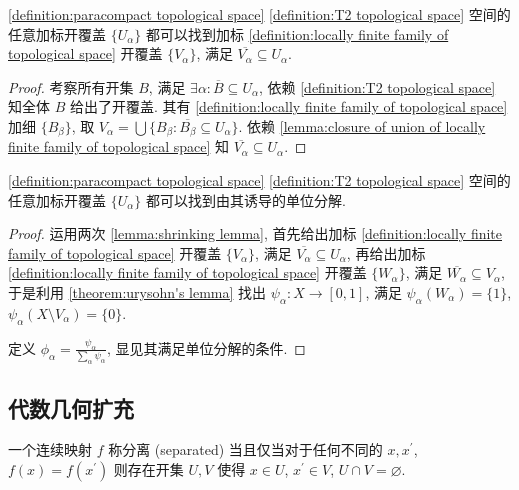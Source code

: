 \begin{lemma}[收缩引理]
    \label {lemma:shrinking lemma}
    \ref{definition:paracompact topological space} \ref{definition:T2 topological space} 空间的任意加标开覆盖 \(\{U_\alpha\}\) 都可以找到加标 \ref{definition:locally finite family of topological space}
    开覆盖 \(\{V_\alpha\}\), 满足 \(\overline{V_\alpha} \subseteq U_\alpha\).

    \begin{proof}
        考察所有开集 \(B\), 满足 \(\exists \alpha : \overline{B} \subseteq U_\alpha\), 依赖 \ref{definition:T2 topological space} 知全体 \(B\) 给出了开覆盖.
        其有 \ref{definition:locally finite family of topological space} 加细 \(\{B_\beta\}\), 取 \(V_\alpha = \bigcup \{B_\beta : \overline{B_\beta} \subseteq U_\alpha\}\).
        依赖 \ref{lemma:closure of union of locally finite family of topological space} 知 \(\overline{V_\alpha} \subseteq U_\alpha\).
    \end{proof}
\end{lemma}

\begin{theorem}[单位分解定理]
    \label {theorem:partition of unity theorem (paracompact)}
    \ref{definition:paracompact topological space} \ref{definition:T2 topological space} 空间的任意加标开覆盖 \(\{U_\alpha\}\) 都可以找到由其诱导的单位分解.

    \begin{proof}
        运用两次 \ref{lemma:shrinking lemma}, 首先给出加标 \ref{definition:locally finite family of topological space} 开覆盖 \(\{V_\alpha\}\), 满足 \(\overline{V_\alpha} \subseteq U_\alpha\),
        再给出加标 \ref{definition:locally finite family of topological space} 开覆盖 \(\{W_\alpha\}\), 满足 \(\overline{W_\alpha} \subseteq V_\alpha\), 于是利用 \ref{theorem:urysohn's lemma} 找出 \(\psi_\alpha : X \to [0,1]\),
        满足 \(\psi_\alpha (W_\alpha) = \{1\}\), \(\psi_\alpha (X \setminus V_\alpha) = \{0\}\).

        定义 \(\phi_\alpha = \frac{\psi_\alpha}{\sum_\alpha \psi_\alpha}\), 显见其满足单位分解的条件.
    \end{proof}
\end{theorem}

\subsection{代数几何扩充}

\begin{definition}[分离]
    \label {definition:separation of continuous function}
    一个连续映射 \(f\) 称分离 (separated) 当且仅当对于任何不同的 \(x,x^\prime\), \(f (x) = f (x^\prime)\) 
    则存在开集 \(U,V\) 使得 \(x \in U\), \(x^\prime \in V\), \(U \cap V = \varnothing\).
\end{definition}

